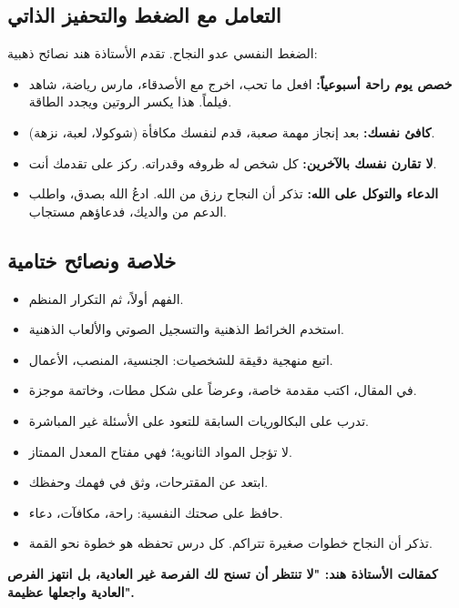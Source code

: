 \documentclass[12pt,a4paper]{book}
\newcommand{\importantAr}[1]{%
	\begin{important}
		\bfseries #1
	\end{important}
}
\begin{document}
	\subsection{التعامل مع الضغط والتحفيز الذاتي}
	
	الضغط النفسي عدو النجاح. تقدم الأستاذة هند نصائح ذهبية:
	
	\begin{itemize}
		\item \textbf{خصص يوم راحة أسبوعياً:} افعل ما تحب، اخرج مع الأصدقاء، مارس رياضة، شاهد فيلماً. هذا يكسر الروتين ويجدد الطاقة.
		\item \textbf{كافئ نفسك:} بعد إنجاز مهمة صعبة، قدم لنفسك مكافأة (شوكولا، لعبة، نزهة).
		\item \textbf{لا تقارن نفسك بالآخرين:} كل شخص له ظروفه وقدراته. ركز على تقدمك أنت.
		\item \textbf{الدعاء والتوكل على الله:} تذكر أن النجاح رزق من الله. ادعُ الله بصدق، واطلب الدعم من والديك، فدعاؤهم مستجاب.
	\end{itemize}
	
	

	\subsection{خلاصة ونصائح ختامية}
	\label{sec:random-tips16}
	
	\begin{itemize}
		\item الفهم أولاً، ثم التكرار المنظم.
		\item استخدم الخرائط الذهنية والتسجيل الصوتي والألعاب الذهنية.
		\item اتبع منهجية دقيقة للشخصيات: الجنسية، المنصب، الأعمال.
		\item في المقال، اكتب مقدمة خاصة، وعرضاً على شكل مطات، وخاتمة موجزة.
		\item تدرب على البكالوريات السابقة للتعود على الأسئلة غير المباشرة.
		\item لا تؤجل المواد الثانوية؛ فهي مفتاح المعدل الممتاز.
		\item ابتعد عن المقترحات، وثق في فهمك وحفظك.
		\item حافظ على صحتك النفسية: راحة، مكافآت، دعاء.
		\item تذكر أن النجاح خطوات صغيرة تتراكم. كل درس تحفظه هو خطوة نحو القمة.
	\end{itemize}
	
	\importantAr{كمقالت الأستاذة هند: "لا تنتظر أن تسنح لك الفرصة غير العادية، بل انتهز الفرص العادية واجعلها عظيمة".}
	
\end{document}
